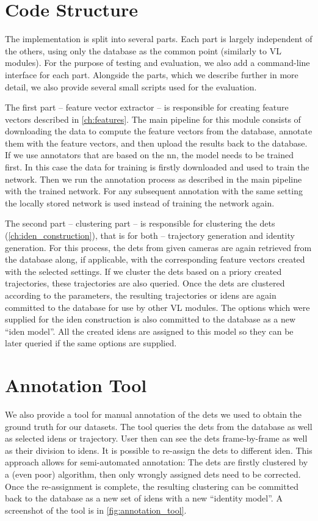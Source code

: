\section{Code Structure}
The implementation is split into several parts. Each part is largely independent of the others, using only the database as the common point (similarly to \gls{VL} modules). For the purpose of testing and evaluation, we also add a command-line interface for each part.  Alongside the parts, which we describe further in more detail, we also provide several small scripts used for the evaluation.

The first part -- feature vector extractor -- is responsible for creating feature vectors described in \autoref{ch:features}. The main pipeline for this module consists of downloading the data to compute the feature vectors from the database, annotate them with the feature vectors, and then upload the results back to the database. If we use annotators that are based on the \gls{nn}, the model needs to be trained first. In this case the data for training is firstly downloaded and used to train the network. Then we run the annotation process as described in the main pipeline with the trained network. For any subsequent annotation with the same setting the locally stored network is used instead of training the network again.

The second part -- clustering part -- is responsible for clustering the \glspl{det} (\autoref{ch:iden_construction}), that is for both -- trajectory generation and identity generation. For this process, the \glspl{det} from given cameras are again retrieved from the database along, if applicable, with the corresponding feature vectors created with the selected settings. If we cluster the \glspl{det} based on a priory created trajectories, these trajectories are also queried. Once the \glspl{det} are clustered according to the parameters, the resulting trajectories or \glspl{iden} are again committed to the database for use by other \gls{VL} modules. The options which were supplied for the \gls{iden} construction is also committed to the database as a new ``\gls{iden} model''. All the created \glspl{iden} are assigned to this model so they can be later queried if the same options are supplied.


\section{Annotation Tool}
We also provide a tool for manual annotation of the \glspl{det} we used to obtain the ground truth for our datasets. The tool queries the \glspl{det} from the database as well as selected \glspl{iden} or trajectory. User then can see the \glspl{det} frame-by-frame as well as their division to \glspl{iden}. It is possible to re-assign the \glspl{det} to different \gls{iden}. This approach allows for semi-automated annotation: The \glspl{det} are firstly clustered by a (even poor) algorithm, then only wrongly assigned \glspl{det} need to be corrected. Once the re-assignment is complete, the resulting clustering can be committed back to the database as a new set of \glspl{iden} with a new ``identity model''. A screenshot of the tool is in \autoref{fig:annotation_tool}.

